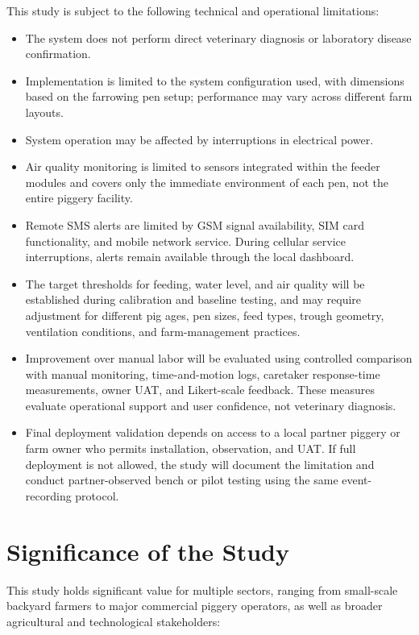 This study is subject to the following technical and operational limitations:
\begin{itemize}
    \item The system does not perform direct veterinary diagnosis or laboratory disease confirmation.
    \item Implementation is limited to the system configuration used, with dimensions based on the farrowing pen setup; performance may vary across different farm layouts.
    \item System operation may be affected by interruptions in electrical power.
    \item Air quality monitoring is limited to sensors integrated within the feeder modules and covers only the immediate environment of each pen, not the entire piggery facility.
    \item Remote SMS alerts are limited by GSM signal availability, SIM card functionality, and mobile network service. During cellular service interruptions, alerts remain available through the local dashboard.
    \item The target thresholds for feeding, water level, and air quality will be established during calibration and baseline testing, and may require adjustment for different pig ages, pen sizes, feed types, trough geometry, ventilation conditions, and farm-management practices.
    \item Improvement over manual labor will be evaluated using controlled comparison with manual monitoring, time-and-motion logs, caretaker response-time measurements, owner UAT, and Likert-scale feedback. These measures evaluate operational support and user confidence, not veterinary diagnosis.
    \item Final deployment validation depends on access to a local partner piggery or farm owner who permits installation, observation, and UAT. If full deployment is not allowed, the study will document the limitation and conduct partner-observed bench or pilot testing using the same event-recording protocol.
\end{itemize}


\section{Significance of the Study}

This study holds significant value for multiple sectors, ranging from small-scale backyard farmers to major commercial piggery operators, as well as broader agricultural and technological stakeholders:

